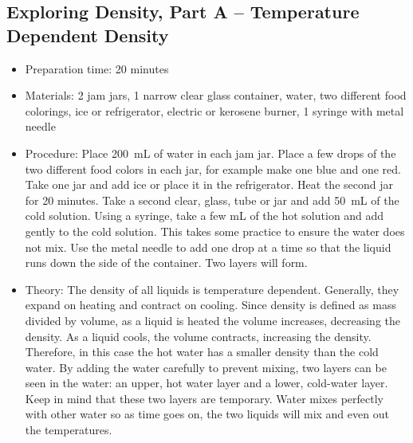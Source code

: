 \subsection{Exploring Density, Part A -- Temperature Dependent Density}
\begin{itemize}
\item{Preparation time: 20 minutes}
\item{Materials: 2 jam jars, 1 narrow clear glass container, water, two different food colorings, ice or refrigerator, electric or kerosene burner, 1 syringe with metal needle}
\item{Procedure: Place 200~mL of water in each jam jar. Place a few drops of the two different food colors in each jar, for example make one blue and one red. Take one jar and add ice or place it in the refrigerator. Heat the second jar for 20 minutes. Take a second clear, glass, tube or jar and add 50~mL of the cold solution. Using a syringe, take a few mL of the hot solution and add gently to the cold solution. This takes some practice to ensure the water does not mix. Use the metal needle to add one drop at a time so that the liquid runs down the side of the container. Two layers will form. }
\item{Theory: The density of all liquids is temperature dependent. Generally, they expand on heating and contract on cooling. Since density is defined as mass divided by volume, as a liquid is heated the volume increases, decreasing the density. As a liquid cools, the volume contracts, increasing the density. Therefore, in this case the hot water has a smaller density than the cold water. By adding the water carefully to prevent mixing, two layers can be seen in the water: an upper, hot water layer and a lower, cold-water layer. Keep in mind that these two layers are temporary. Water mixes perfectly with other water so as time goes on, the two liquids will mix and even out the temperatures.}
\end{itemize}

